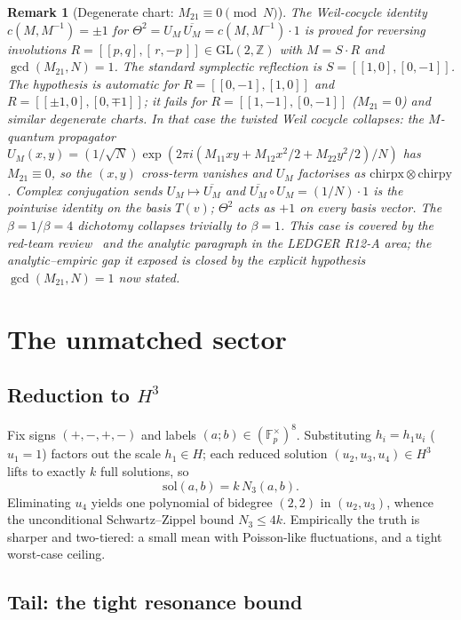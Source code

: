 \documentclass[11pt]{article}
\newtheorem{remark}[theorem]{Remark}
\begin{document}
\begin{remark}[Degenerate chart: $M_{21}\equiv 0\pmod N$]\label{rem:reversing_degenerate}
The Weil-cocycle identity
$c(M,M^{-1})=\pm 1$ for
$\Theta^2=U_M\,\overline{U_M}=c(M,M^{-1})\cdot 1$
is proved for reversing involutions
$R=[\![p,q],[\,r,-p\,]\!]\in\mathrm{GL}(2,\mathbb Z)$
with $M=S\cdot R$ and
$\gcd(M_{21},N)=1$.
The standard symplectic reflection is
$S=[\![1,0],[0,-1]\!]$.
The hypothesis is automatic for
$R=[\![0,-1],[1,0]\!]$ and
$R=[\![\pm 1,0],[0,\mp 1]\!]$;
it \emph{fails} for $R=[\![1,-1],[0,-1]\!]$
($M_{21}=0$) and similar degenerate charts.
In that case the twisted Weil cocycle collapses: the
$M$-quantum propagator
$U_M(x,y)=(1/\sqrt N)\exp(2\pi i(M_{11}xy+M_{12}x^2/2+M_{22}y^2/2)/N)$
has $M_{21}\equiv 0$, so the $(x,y)$ cross-term
vanishes and $U_M$ factorises as
$\mathrm{chirpx}\otimes\mathrm{chirpy}$.
Complex conjugation sends
$U_M\mapsto\overline{U_M}$ and
$\overline{U_M}\circ U_M=(1/N)\cdot 1$
is the \emph{pointwise} identity on the basis
$T(v)$;
$\Theta^2$ acts as $+1$ on every basis vector.
The $\beta=1/\beta=4$ dichotomy collapses trivially
to $\beta=1$.
This case is covered by the red-team
review~\cite{redteam5} and the analytic paragraph in
the LEDGER R12-A area;
the analytic--empiric gap it exposed is closed
by the explicit hypothesis
$\gcd(M_{21},N)=1$ now stated.
\end{remark}


\section{The unmatched sector}\label{sec:unmatched}

\subsection{Reduction to \texorpdfstring{$H^3$}{H3}}

Fix signs $(+,-,+,-)$ and labels $(a;b)\in(\mathbb F_p^\times)^8$.
Substituting $h_i=h_1u_i$ ($u_1=1$) factors out the scale $h_1\in H$;
each reduced solution $(u_2,u_3,u_4)\in H^3$ lifts to exactly $k$
full solutions, so
\[
\mathrm{sol}(a,b)=k\,N_3(a,b).
\]
Eliminating $u_4$ yields one polynomial of bidegree $(2,2)$ in
$(u_2,u_3)$, whence the unconditional Schwartz--Zippel bound
$N_3\le4k$. Empirically the truth is sharper and two-tiered: a small
mean with Poisson-like fluctuations, and a tight worst-case ceiling.

\subsection{Tail: the tight resonance bound}
\end{document}
